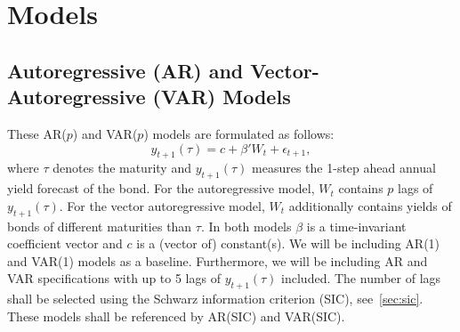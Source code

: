 \section{Models}
\subsection{Autoregressive (AR) and Vector-Autoregressive (VAR) Models}
\label{sec:arvar}
These AR($p$) and VAR($p$) models are formulated as follows:
\begin{equation}
	y_{t+1}(\tau) = c + \beta' W_t + \epsilon_{t+1},
\end{equation}
where $\tau$ denotes the maturity and $y_{t+1}(\tau)$ measures the 1-step ahead annual yield forecast of the bond. 
For the autoregressive model, $W_t$ contains $p$ lags of $y_{t+1}(\tau)$. For the vector autoregressive model, $W_t$ additionally contains yields of bonds of different maturities than $\tau$. 
In both models $\beta$ is a time-invariant coefficient vector and $c$ is a (vector of) constant(s). 
We will be including AR(1) and VAR(1) models as a baseline. 
Furthermore, we will be including AR and VAR specifications with up to 5 lags of $y_{t+1}(\tau)$ included. 
The number of lags shall be selected using the Schwarz information criterion (SIC), see~\cref{sec:sic}. 
These models shall be referenced by AR(SIC) and VAR(SIC). 

